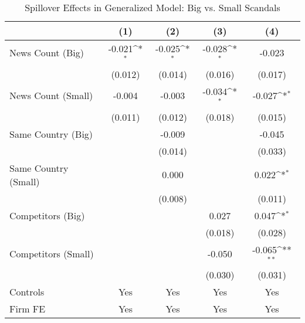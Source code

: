 \begin{table}[htbp]\centering
\def\sym#1{\ifmmode^{#1}\else\(^{#1}\)\fi}
\caption{Spillover Effects in Generalized Model: Big vs. Small Scandals}
\begin{tabular}{l*{4}{c}}
\toprule
                    &\multicolumn{1}{c}{(1)}         &\multicolumn{1}{c}{(2)}         &\multicolumn{1}{c}{(3)}         &\multicolumn{1}{c}{(4)}         \\
\midrule
News Count (Big)    &      -0.021\sym{*}  &      -0.025\sym{*}  &      -0.028\sym{*}  &      -0.023         \\
                    &     (0.012)         &     (0.014)         &     (0.016)         &     (0.017)         \\
\addlinespace
News Count (Small)  &      -0.004         &      -0.003         &      -0.034\sym{*}  &      -0.027\sym{*}  \\
                    &     (0.011)         &     (0.012)         &     (0.018)         &     (0.015)         \\
\addlinespace
Same Country (Big)  &                     &      -0.009         &                     &      -0.045         \\
                    &                     &     (0.014)         &                     &     (0.033)         \\
\addlinespace
Same Country (Small)&                     &       0.000         &                     &       0.022\sym{*}  \\
                    &                     &     (0.008)         &                     &     (0.011)         \\
\addlinespace
Competitors (Big)   &                     &                     &       0.027         &       0.047\sym{*}  \\
                    &                     &                     &     (0.018)         &     (0.028)         \\
\addlinespace
Competitors (Small) &                     &                     &      -0.050         &      -0.065\sym{**} \\
                    &                     &                     &     (0.030)         &     (0.031)         \\
\midrule
Controls            &         Yes         &         Yes         &         Yes         &         Yes         \\
Firm FE             &         Yes         &         Yes         &         Yes         &         Yes         \\

\end{tabular}
\end{table}
